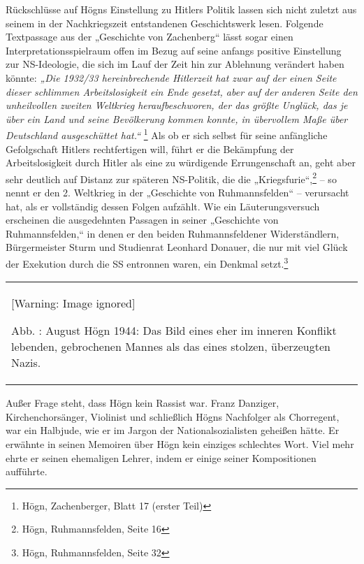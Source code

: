 \documentclass[a4paper]{article}
\newcounter{Abb}
\renewcommand\theAbb{\arabic{Abb}}
\begin{document}
Rückschlüsse auf Högns Einstellung zu Hitlers Politik lassen sich nicht
zuletzt aus seinem in der Nachkriegszeit entstandenen Geschichtswerk
lesen. Folgende Textpassage aus der „Geschichte von Zachenberg“ lässt
sogar einen Interpretationsspielraum offen im Bezug auf seine anfangs
positive Einstellung zur NS-Ideologie, die sich im Lauf der Zeit hin
zur Ablehnung verändert haben könnte: \textit{„Die 1932/33
hereinbrechende Hitlerzeit hat zwar auf der einen Seite dieser
schlimmen Arbeitslosigkeit ein Ende gesetzt, aber auf der anderen Seite
den unheilvollen zweiten Weltkrieg heraufbeschworen, der das größte
Unglück, das je über ein Land und seine Bevölkerung kommen konnte, in
übervollem Maße über Deutschland ausgeschüttet hat.“ }\footnote{ Högn,
Zachenberger, Blatt 17 (erster Teil)}\textit{ }Als ob er sich selbst
für seine anfängliche Gefolgschaft Hitlers rechtfertigen will, führt er
die Bekämpfung der Arbeitslosigkeit durch Hitler als eine zu würdigende
Errungenschaft an, geht aber sehr deutlich auf Distanz zur späteren
NS-Politik, die die „Kriegsfurie“,\footnote{ Högn, Ruhmannsfelden,
Seite 16} – so nennt er den 2. Weltkrieg in der „Geschichte von
Ruhmannsfelden“ – verursacht hat, als er vollständig dessen Folgen
aufzählt. Wie ein Läuterungsversuch erscheinen die ausgedehnten
Passagen in seiner „Geschichte von Ruhmannsfelden,“ in denen er den
beiden Ruhmannsfeldener Widerständlern, Bürgermeister Sturm und
Studienrat Leonhard Donauer, die nur mit viel Glück der Exekution durch
die SS entronnen waren, ein Denkmal setzt.\footnote{ Högn,
Ruhmannsfelden, Seite 32}

\begin{center}
\begin{minipage}{4.928cm}
\begin{flushleft}
\tablefirsthead{}
\tablehead{}
\tabletail{}
\tablelasttail{}
\begin{supertabular}{m{4.728cm}}
  [Warning: Image ignored] %
 
Abb. \stepcounter{Abb}{\theAbb}: August Högn 1944: Das Bild eines eher
im inneren Konflikt lebenden, gebrochenen Mannes als das eines stolzen,
überzeugten Nazis.\\
\end{supertabular}
\end{flushleft}
\end{minipage}
\end{center}
Außer Frage steht, dass Högn kein Rassist war. Franz Danziger,
Kirchenchorsänger, Violinist und schließlich Högns Nachfolger als
Chorregent, war ein Halbjude, wie er im Jargon der Nationalsozialisten
geheißen hätte. Er erwähnte in seinen Memoiren über Högn kein einziges
schlechtes Wort. Viel mehr ehrte er seinen ehemaligen Lehrer, indem er
einige seiner Kompositionen aufführte.
\end{document}
